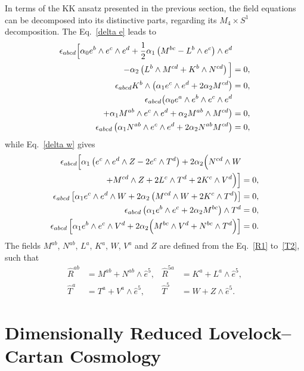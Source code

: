 \documentclass[aps,prd,12pt,superscriptaddress,showpacs,showkeys,longbibliography,reprint,nofootinbib]{revtex4-1}
\begin{document}
In terms of the KK ansatz presented in the previous section, the field equations can be decomposed into its distinctive parts, regarding
its \(M_{4} \times S^1\) decomposition. The Eq.~\eqref{delta e} leads to 
\begin{align}\label{equation}
  \epsilon_{abcd}\Big[\alpha_0 e^b\wedge e^c\wedge e^d + \frac{1}{2}\alpha_1\left(M^{bc}-L^b\wedge e^c\right)\wedge e^d&\notag\\
    -\alpha_2\left(L^b\wedge M^{cd} + K^b\wedge N^{cd}\right)\Big]&=0,\\
  \epsilon_{abcd}K^b\wedge\left(\alpha_1e^c\wedge e^d + 2\alpha_2M^{cd}\right)&=0,\\
  \epsilon_{abcd}\big(\alpha_0 e^a\wedge e^b\wedge e^c\wedge e^d&\notag\\
  +\alpha_1M^{ab}\wedge e^c\wedge e^d+\alpha_2M^{ab}\wedge M^{cd}\big)&=0,\\
  \epsilon_{abcd}\left(\alpha_1N^{ab}\wedge e^c\wedge e^d+2\alpha_2N^{ab}M^{cd}\right)&=0,
\end{align}
while Eq.~\eqref{delta w} gives
\begin{align}
  \epsilon_{abcd}\Big[\alpha_1\left(e^c\wedge e^d\wedge Z-2e^c\wedge T^d\right)
    +2\alpha_2\Big(N^{cd}\wedge W&\notag\\
    +M^{cd}\wedge Z+2L^c\wedge T^d
    +2K^c\wedge V^d\Big)\Big]&=0,\\
  \epsilon_{abcd}\left[\alpha_1e^c\wedge e^ d\wedge W+2\alpha_2\left(M^{cd}\wedge W+2K^c\wedge T^d\right)\right]&=0,\\
  \epsilon_{abcd}\left(\alpha_1e^b\wedge e^c+2\alpha_2M^{bc}\right)\wedge T^d&=0,\\
  \epsilon_{abcd}\left[\alpha_1e^b\wedge e^c\wedge V^d+2\alpha_2\Big(M^{bc}\wedge V^d+N^{bc}\wedge T^d\Big)\right]&=0.
\end{align}
The fields $M^{ab}$, $N^{ab}$, $L^a$, $K^a$, $W$, $V^a$ and $Z$ are defined from the Eq.~\eqref{R1} to~\eqref{T2}, such that
\begin{align*}
  \hat{R}^{ab}&=M^{ab}+N^{ab}\wedge\hat{e}^5, & \hat{R}^{5a}&=K^a+L^a\wedge\hat{e}^5,\\
  \hat{T}^a&=T^a+V^a\wedge\hat{e}^5, & \hat{T}^5&=W+Z\wedge\hat{e}^5.
\end{align*}


\section{Dimensionally Reduced Lovelock--Cartan Cosmology\label{cosmos}}
\end{document}
